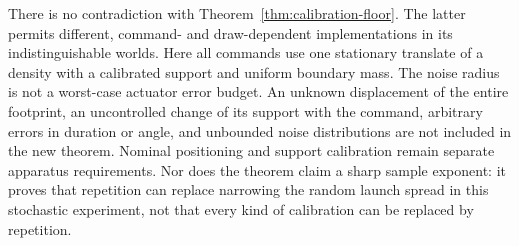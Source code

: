 There is no contradiction with Theorem~\ref{thm:calibration-floor}.
The latter permits different, command- and draw-dependent
implementations in its indistinguishable worlds. Here all commands use
one stationary translate of a density with a calibrated support and
uniform boundary mass. The noise radius is not a worst-case actuator
error budget. An unknown displacement of the entire footprint, an
uncontrolled change of its support with the command, arbitrary errors
in duration or angle, and unbounded noise distributions are not included
in the new theorem. Nominal positioning and support calibration remain
separate apparatus requirements. Nor does the theorem claim a sharp
sample exponent: it proves that repetition can replace narrowing the
random launch spread in this stochastic experiment, not that every
kind of calibration can be replaced by repetition.
